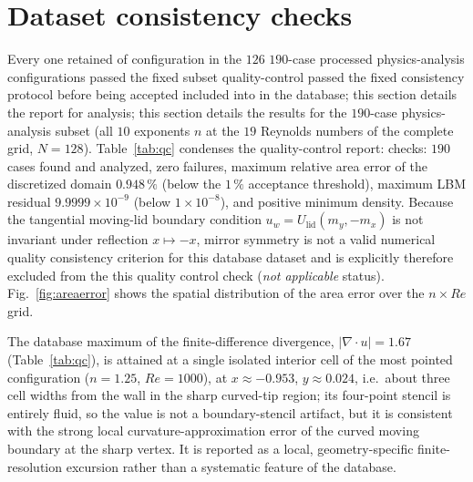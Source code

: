 \documentclass[11pt]{article}
\begin{document}
\section{Dataset consistency checks}\label{sec:database}
Every \color{revred}one \color{revblue}retained\color{black} \color{revred}of \color{revblue}configuration in\color{black} the \color{revred}$126$ \color{revblue}$190$-case\color{black} \color{revred}processed \color{revblue}physics-analysis\color{black} \color{revred}configurations passed the fixed \color{revblue}subset\color{black}
\color{revred}quality-control \color{revblue}passed the fixed consistency\color{black} protocol before being \color{revred}accepted \color{revblue}included\color{black} \color{revred}into \color{revblue}in\color{black} the \color{revred}database; this section details the report for \color{revblue}analysis;\color{black}
\color{revblue}this section details the results for
\color{black}
the $190$-case physics-analysis subset (all $10$ exponents $n$ at the $19$
Reynolds numbers of the complete grid, $N=128$). Table~\ref{tab:qc} condenses the
\color{revred}quality-control report: \color{revblue}checks:\color{black} $190$ cases found
and analyzed, zero failures, maximum relative area error of the discretized
domain $0.948\,\%$ (below the $1\,\%$ acceptance threshold), maximum LBM residual
$9.9999\times10^{-9}$ (below $1\times10^{-8}$), and positive minimum density.
Because the tangential moving-lid boundary condition
$u_w=U_{\mathrm{lid}}(m_y,-m_x)$ is not invariant under reflection
$x\mapsto-x$, mirror symmetry is not a valid \color{revred}numerical quality \color{revblue}consistency\color{black} criterion for
this \color{revred}database \color{revblue}dataset\color{black} and is \color{revred}explicitly \color{revblue}therefore\color{black} excluded from \color{revred}the \color{revblue}this\color{black} \color{revred}quality control \color{revblue}check\color{black}
(\emph{not applicable} status). Fig.~\ref{fig:areaerror} shows the spatial
distribution of the area error over the $n\times Re$ grid.

The database maximum of the finite-difference divergence, $|\nabla\cdot u|=1.67$
(Table~\ref{tab:qc}), is attained at a single isolated interior cell of the most
pointed configuration ($n=1.25$, $Re=1000$), at $x\approx-0.953$,
$y\approx0.024$, i.e.\ about three cell widths from the wall in the sharp
curved-tip region; its four-point stencil is entirely fluid, so the value is
not a boundary-stencil artifact, but it is consistent with the strong local
curvature-approximation error of the curved moving boundary at the sharp
vertex. It is reported as a local, geometry-specific finite-resolution
excursion rather than a systematic feature of the database.
\end{document}
